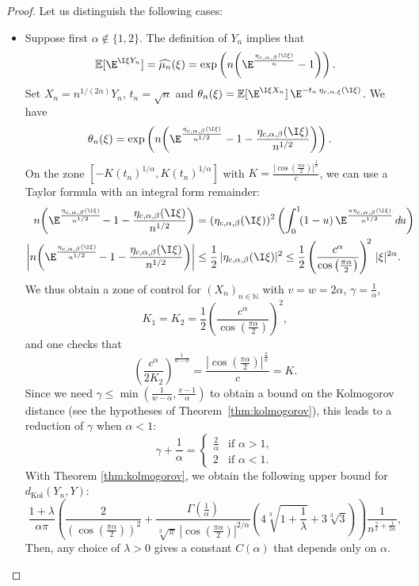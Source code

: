 \documentclass[envcountsame]{svmult}
\newcommand{\N}{\mathbb{N}}
\newcommand{\esper}{\mathbb{E}}
\newcommand{\dkol}{d_\mathrm{Kol}}
\newcommand{\DD}[1]{\,d\hspace*{-0.3mm}{#1}}
\begin{document}
\begin{proof}
Let us distinguish the following cases:
\begin{itemize}
    \item Suppose first $\alpha \notin \{1,2\}$. The definition of $Y_n$ implies that 
$$\esper[\E^{\I \xi Y_n}]=\widehat{\mu_n}(\xi) = \exp\left(n\!\left(\E^{\frac{\eta_{c,\alpha,\beta}(\I \xi)}{n}}-1\right)\right).$$
Set $X_n = n^{1/(2\alpha)}Y_n$, $t_n = \sqrt{n}$ and $\theta_n(\xi) = \esper[\E^{\I \xi X_n}]\,\E^{-t_n\,\eta_{c,\alpha,\xi}(\I \xi)}$. We have
\begin{align*}
\theta_n(\xi) &= \exp\left(n\!\left(\E^{\frac{\eta_{c,\alpha,\beta}(\I \xi)}{n^{1/2}}}-1-\frac{\eta_{c,\alpha,\beta}(\I \xi)}{n^{1/2}}\right)\right).
\end{align*}
On the zone $[-K(t_n)^{1/\alpha},K(t_n)^{1/\alpha}]$ with $K = \frac{|\cos(\frac{\pi \alpha}{2})|^{\frac{2}{\alpha}}}{c}$, we can use a Taylor formula with an integral form remainder:
\begin{align*}
n\!\left(\E^{\frac{\eta_{c,\alpha,\beta}(\I \xi)}{n^{1/2}}}\!-1-\frac{\eta_{c,\alpha,\beta}(\I \xi)}{n^{1/2}}\right) &= (\eta_{c,\alpha,\beta}(\I \xi))^2\left(\int_{0}^1\!(1-u)\,\E^{\frac{u\eta_{c,\alpha,\beta}(\I \xi)}{n^{1/2}}}\DD{u}\right) \\
\left|n\!\left(\E^{\frac{\eta_{c,\alpha,\beta}(\I \xi)}{n^{1/2}}}\!-1-\frac{\eta_{c,\alpha,\beta}(\I \xi)}{n^{1/2}}\right) \right| &\leq  \frac{1}{2}\,|\eta_{c,\alpha,\beta}(\I \xi)|^2 \leq \frac{1}{2}\left(\frac{c^\alpha}{\cos\left(\frac{\pi\alpha}{2}\right)}\right)^{\!2}\,|\xi|^{2\alpha}.
\end{align*}
We thus obtain a zone of control for $(X_n)_{n\in \N}$ with $v=w=2\alpha$, $\gamma = \frac{1}{\alpha}$,  
$$K_1=K_2 = \frac{1}{2}\left(\frac{c^\alpha}{\cos\left(\frac{\pi\alpha}{2}\right)}\right)^{\!2},$$ and one checks that
$$\left(\frac{c^\alpha}{2K_2}\right)^{\frac{1}{w-\alpha}} = \frac{|\cos(\frac{\pi \alpha}{2})|^{\frac{2}{\alpha}}}{c} = K.$$
Since we need $\gamma \leq \min\left(\frac{1}{w-\alpha},\frac{v-1}{\alpha}\right)$ to obtain a bound on the Kolmogorov distance (see the hypotheses of Theorem~\ref{thm:kolmogorov}), this leads to a reduction of $\gamma$ when $\alpha<1$:
$$\gamma+\frac{1}{\alpha} = \begin{cases}
    \frac{2}{\alpha} &\text{if }\alpha>1,\\
    2 &\text{if }\alpha<1.
\end{cases}$$
With Theorem \ref{thm:kolmogorov}, we obtain the following upper bound for $\dkol(Y_n,Y)$:
$$ \frac{1+\lambda}{\alpha\pi}\left(\frac{2}{\left(\cos(\frac{\pi\alpha}{2})\right)^2}+\frac{\Gamma(\frac{1}{\alpha})}{\sqrt[3]{\pi}\,\left|\cos(\frac{\pi\alpha}{2})\right|^{2/\alpha}}\left(4\sqrt[3]{1+\frac{1}{\lambda}}+3\sqrt[3]{3}\right)\right)\frac{1}{n^{\frac{\gamma}{2}+\frac{1}{2\alpha}}},$$
Then, any choice of $\lambda>0$ gives a constant $C(\alpha)$ that depends only on $\alpha$.


\end{itemize}
\end{proof}
\end{document}
